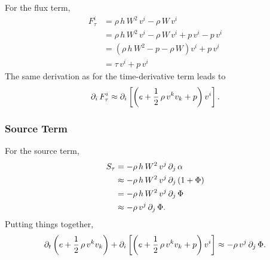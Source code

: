 For the flux term,
\begin{align}
  F^{i}_{\tau}&=\rho\,h\,W^{2}\,v^{i}-\rho\,W\,v^{i} \\
  &=\rho\,h\,W^{2}\,v^{i}-\rho\,W\,v^{i}+p\,v^{i}-p\,v^{i} \\
  &=\left(\rho\,h\,W^{2}-p-\rho\,W\right)v^{i}+p\,v^{i} \\
  &=\tau\,v^{i}+p\,v^{i}
\end{align}
The same derivation as for the time-derivative term leads to
\begin{equation}
  \partial_{i}\,F^{i}_{\tau}
  \approx\partial_{i}\left[\left(e+\frac{1}{2}\,\rho\,v^{k}v_{k}+p\right)v^{i}\right].
\end{equation}

\subsubsection{Source Term}

For the source term,
\begin{align}
  S_{\tau}&=-\rho\,h\,W^{2}\,v^{j}\,\partial_{j}\,\alpha \\
  &\approx-\rho\,h\,W^{2}\,v^{j}\,\partial_{j}\left(1+\Phi\right) \\
  &=-\rho\,h\,W^{2}\,v^{j}\,\partial_{j}\,\Phi \\
  &\approx-\rho\,v^{j}\,\partial_{j}\,\Phi.
\end{align}
Putting things together,
\begin{equation}
  \partial_{t}\left(e+\frac{1}{2}\,\rho\,v^{k}v_{k}\right)
  +\partial_{i}\left[\left(e+\frac{1}{2}\,\rho\,v^{k}v_{k}+p\right)v^{i}\right]
  \approx-\rho\,v^{j}\,\partial_{j}\,\Phi.
\end{equation}

\let\normv\undefined
\let\TF\undefined
\let\LF\undefined
\let\LG\undefined
\let\hNR\undefined
